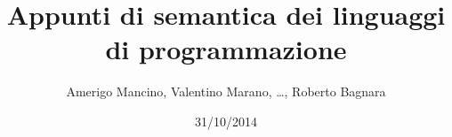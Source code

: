 \documentclass[12pt,a4]{book}
\begin{document}
\title{Appunti di semantica dei linguaggi di programmazione}
\author{Amerigo Mancino, Valentino Marano, \dots, Roberto Bagnara}
\date{31/10/2014}

\maketitle

\tableofcontents












\end{document}
